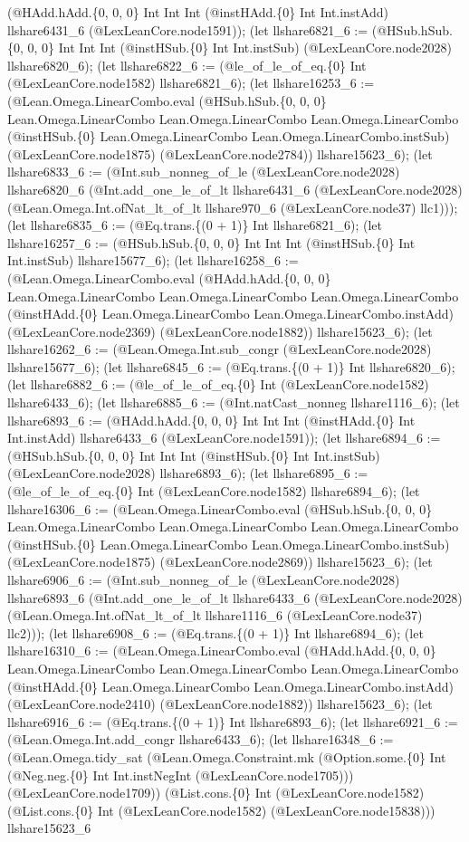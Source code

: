 \documentclass[11pt]{article}
\begin{document}
(@HAdd.hAdd.\{0, 0, 0\} Int Int Int (@instHAdd.\{0\} Int Int.instAdd) llshare6431\_6 (@LexLeanCore.node1591)); (let llshare6821\_6 := (@HSub.hSub.\{0, 0, 0\} Int Int Int (@instHSub.\{0\} Int Int.instSub) (@LexLeanCore.node2028) llshare6820\_6); (let llshare6822\_6 := (@le\_of\_le\_of\_eq.\{0\} Int (@LexLeanCore.node1582) llshare6821\_6); (let llshare16253\_6 := (@Lean.Omega.LinearCombo.eval (@HSub.hSub.\{0, 0, 0\} Lean.Omega.LinearCombo Lean.Omega.LinearCombo Lean.Omega.LinearCombo (@instHSub.\{0\} Lean.Omega.LinearCombo Lean.Omega.LinearCombo.instSub) (@LexLeanCore.node1875) (@LexLeanCore.node2784)) llshare15623\_6); (let llshare6833\_6 := (@Int.sub\_nonneg\_of\_le (@LexLeanCore.node2028) llshare6820\_6 (@Int.add\_one\_le\_of\_lt llshare6431\_6 (@LexLeanCore.node2028) (@Lean.Omega.Int.ofNat\_lt\_of\_lt llshare970\_6 (@LexLeanCore.node37) llc1))); (let llshare6835\_6 := (@Eq.trans.\{(0 + 1)\} Int llshare6821\_6); (let llshare16257\_6 := (@HSub.hSub.\{0, 0, 0\} Int Int Int (@instHSub.\{0\} Int Int.instSub) llshare15677\_6); (let llshare16258\_6 := (@Lean.Omega.LinearCombo.eval (@HAdd.hAdd.\{0, 0, 0\} Lean.Omega.LinearCombo Lean.Omega.LinearCombo Lean.Omega.LinearCombo (@instHAdd.\{0\} Lean.Omega.LinearCombo Lean.Omega.LinearCombo.instAdd) (@LexLeanCore.node2369) (@LexLeanCore.node1882)) llshare15623\_6); (let llshare16262\_6 := (@Lean.Omega.Int.sub\_congr (@LexLeanCore.node2028) llshare15677\_6); (let llshare6845\_6 := (@Eq.trans.\{(0 + 1)\} Int llshare6820\_6); (let llshare6882\_6 := (@le\_of\_le\_of\_eq.\{0\} Int (@LexLeanCore.node1582) llshare6433\_6); (let llshare6885\_6 := (@Int.natCast\_nonneg llshare1116\_6); (let llshare6893\_6 := (@HAdd.hAdd.\{0, 0, 0\} Int Int Int (@instHAdd.\{0\} Int Int.instAdd) llshare6433\_6 (@LexLeanCore.node1591)); (let llshare6894\_6 := (@HSub.hSub.\{0, 0, 0\} Int Int Int (@instHSub.\{0\} Int Int.instSub) (@LexLeanCore.node2028) llshare6893\_6); (let llshare6895\_6 := (@le\_of\_le\_of\_eq.\{0\} Int (@LexLeanCore.node1582) llshare6894\_6); (let llshare16306\_6 := (@Lean.Omega.LinearCombo.eval (@HSub.hSub.\{0, 0, 0\} Lean.Omega.LinearCombo Lean.Omega.LinearCombo Lean.Omega.LinearCombo (@instHSub.\{0\} Lean.Omega.LinearCombo Lean.Omega.LinearCombo.instSub) (@LexLeanCore.node1875) (@LexLeanCore.node2869)) llshare15623\_6); (let llshare6906\_6 := (@Int.sub\_nonneg\_of\_le (@LexLeanCore.node2028) llshare6893\_6 (@Int.add\_one\_le\_of\_lt llshare6433\_6 (@LexLeanCore.node2028) (@Lean.Omega.Int.ofNat\_lt\_of\_lt llshare1116\_6 (@LexLeanCore.node37) llc2))); (let llshare6908\_6 := (@Eq.trans.\{(0 + 1)\} Int llshare6894\_6); (let llshare16310\_6 := (@Lean.Omega.LinearCombo.eval (@HAdd.hAdd.\{0, 0, 0\} Lean.Omega.LinearCombo Lean.Omega.LinearCombo Lean.Omega.LinearCombo (@instHAdd.\{0\} Lean.Omega.LinearCombo Lean.Omega.LinearCombo.instAdd) (@LexLeanCore.node2410) (@LexLeanCore.node1882)) llshare15623\_6); (let llshare6916\_6 := (@Eq.trans.\{(0 + 1)\} Int llshare6893\_6); (let llshare6921\_6 := (@Lean.Omega.Int.add\_congr llshare6433\_6); (let llshare16348\_6 := (@Lean.Omega.tidy\_sat (@Lean.Omega.Constraint.mk (@Option.some.\{0\} Int (@Neg.neg.\{0\} Int Int.instNegInt (@LexLeanCore.node1705))) (@LexLeanCore.node1709)) (@List.cons.\{0\} Int (@LexLeanCore.node1582) (@List.cons.\{0\} Int (@LexLeanCore.node1582) (@LexLeanCore.node15838))) llshare15623\_6 
\end{document}
